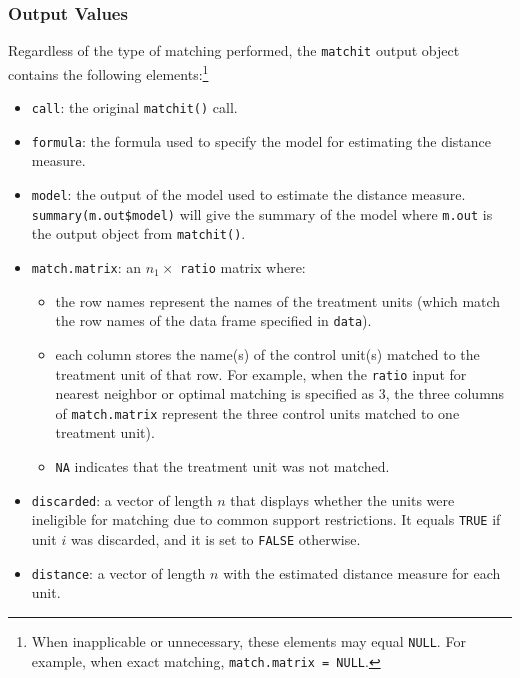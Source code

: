 \subsubsection{Output Values}
\label{sec:outputs}

Regardless of the type of matching performed, the \texttt{matchit}
output object contains the following elements:\footnote{When
  inapplicable or unnecessary, these elements may equal {\tt NULL}.
  For example, when exact matching, {\tt match.matrix = NULL}.}

\begin{itemize}
\item \texttt{call}: the original {\tt matchit()} call.
  
\item \texttt{formula}: the formula used to specify the model for
  estimating the distance measure.
  
\item \texttt{model}: the output of the model used to estimate
  the distance measure.  \texttt{summary(m.out\$model)} will give the
  summary of the model where \texttt{m.out} is the output object from
  \texttt{matchit()}.
  
\item \texttt{match.matrix}: an $n_1 \times$ \texttt{ratio} matrix
  where:
  \begin{itemize}
  \item the row names represent the names of the treatment units
    (which match the row names of the data frame specified in
    \texttt{data}).
  \item each column stores the name(s) of the control unit(s) matched
    to the treatment unit of that row. For example, when the
    \texttt{ratio} input for nearest neighbor or optimal matching is
    specified as 3, the three columns of \texttt{match.matrix}
    represent the three control units matched to one treatment unit).
  \item \texttt{NA} indicates that the treatment unit was not matched.
  \end{itemize}
  
\item \texttt{discarded}: a vector of length $n$ that displays whether
  the units were ineligible for matching due to common support
  restrictions.  It equals \texttt{TRUE} if unit $i$ was discarded,
  and it is set to \texttt{FALSE} otherwise.
  
\item \texttt{distance}: a vector of length $n$ with the estimated
  distance measure for each unit.
  

\end{itemize}
